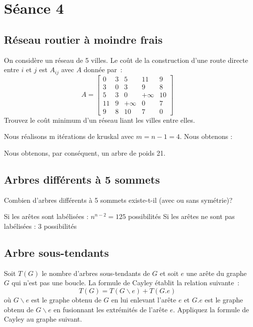 \section{Séance 4}

\subsection{Réseau routier à moindre frais}
On considère un réseau de 5 villes. Le coût de la construction d'une route directe entre $i$ et $j$ est $A_{ij}$ avec $A$ donnée par~:
\[
  A = \begin{bmatrix}
    0 & 3 & 5 & 11 & 9 \\
    3 & 0 & 3 & 9 & 8 \\
    5 & 3 & 0 & +\infty & 10 \\
    11 & 9 & +\infty & 0 & 7 \\
    9 & 8 & 10 & 7 & 0
  \end{bmatrix}
\]
Trouvez le coût minimum d'un réseau liant les villes entre elles.
\begin{solution}
Nous réalisons m itérations de kruskal avec $m=n-1=4$. Nous obtenons :
\begin{center}
  \end{center}
	Nous obtenons, par conséquent, un arbre de poids 21.
	\end{solution}
\subsection{Arbres différents à 5 sommets}
Combien d'arbres différents à 5 sommets existe-t-il (avec ou sans symétrie)?
\begin{solution}
Si les arêtes sont labélisées : $n^{n-2}=125$ possibilités
Si les arêtes ne sont pas labélisées : $3$ possibilités 
\end{solution}
\subsection{Arbre sous-tendants}
Soit $T(G)$ le nombre d'arbres sous-tendants de $G$ et soit $e$ une arête du graphe $G$ qui n'est pas une boucle. La formule de Cayley établit la relation suivante~:
\[
  T(G) = T(G \backslash e) + T(G.e)
\]
où $G \backslash e$ est le graphe obtenu de $G$ en lui enlevant l'arête $e$ et $G.e$ est le graphe obtenu de $G \backslash e$ en fusionnant les extrémités de l'arête $e$. Appliquez la formule de Cayley au graphe suivant.

